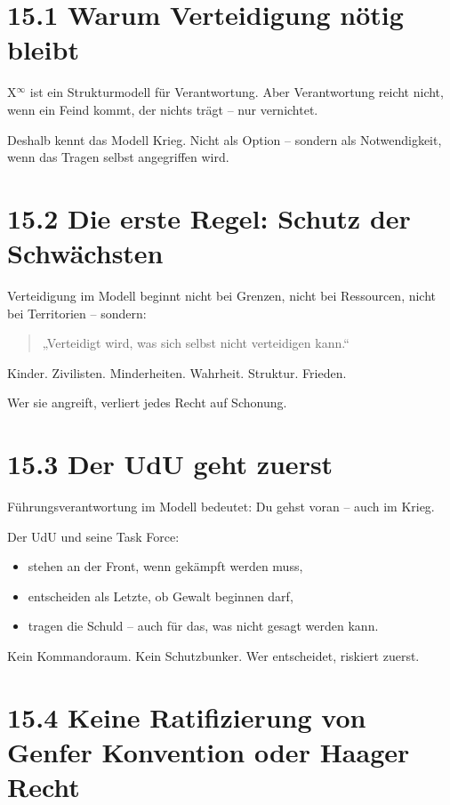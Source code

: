 \documentclass[12pt,a4paper]{book}
\begin{document}
\section*{15.1 Warum Verteidigung nötig bleibt}

X$^\infty$ ist ein Strukturmodell für Verantwortung.  
Aber Verantwortung reicht nicht,  
wenn ein Feind kommt, der nichts trägt – nur vernichtet.

Deshalb kennt das Modell Krieg.  
Nicht als Option – sondern als Notwendigkeit,  
wenn das Tragen selbst angegriffen wird.

\section*{15.2 Die erste Regel: Schutz der Schwächsten}

Verteidigung im Modell beginnt nicht bei Grenzen, nicht bei Ressourcen,  
nicht bei Territorien – sondern:

\begin{quote}
„Verteidigt wird, was sich selbst nicht verteidigen kann.“  
\end{quote}

Kinder. Zivilisten. Minderheiten.  
Wahrheit. Struktur. Frieden.

Wer sie angreift, verliert jedes Recht auf Schonung.

\section*{15.3 Der UdU geht zuerst}

Führungsverantwortung im Modell bedeutet:  
Du gehst voran – auch im Krieg.

Der UdU und seine Task Force:

\begin{itemize}
    \item stehen an der Front, wenn gekämpft werden muss,
    \item entscheiden als Letzte, ob Gewalt beginnen darf,
    \item tragen die Schuld – auch für das, was nicht gesagt werden kann.
\end{itemize}

Kein Kommandoraum. Kein Schutzbunker.  
Wer entscheidet, riskiert zuerst.

\section*{15.4 Keine Ratifizierung von Genfer Konvention oder Haager Recht}
\end{document}
